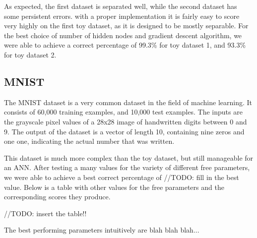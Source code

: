 \documentclass[12pt, twocolumn]{article}
\begin{document}
As expected, the first dataset is separated well, while the second dataset has some persistent errors. with a proper implementation it is fairly easy to score very highly on the first toy dataset, as it is designed to be mostly separable. For the best choice of number of hidden nodes and gradient descent algorithm, we were able to achieve a correct percentage of 99.3\% for toy dataset 1, and 93.3\% for toy dataset 2.

\subsection{MNIST}

The MNIST dataset is a very common dataset in the field of machine learning. It consists of 60,000 training examples, and 10,000 test examples. The inputs are the grayscale pixel values of a 28x28 image of handwritten digits between 0 and 9. The output of the dataset is a vector of length 10, containing nine zeros and one one, indicating the actual number that was written.

This dataset is much more complex than the toy dataset, but still manageable for an ANN. After testing a many values for the variety of different free parameters, we were able to achieve a best correct percentage of //TODO: fill in the best value. Below is a table with other values for the free parameters and the corresponding scores they produce.

//TODO: insert the table!!

The best performing parameters intuitively are blah blah blah...

 
\end{document}
